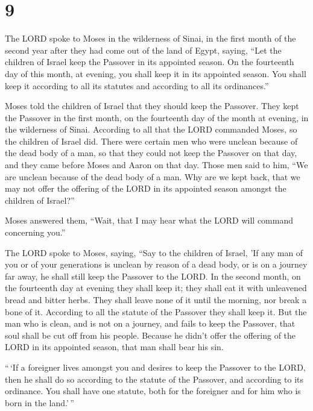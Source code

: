 \hypertarget{section-8}{%
\section{9}\label{section-8}}

 The LORD spoke to Moses in the wilderness of Sinai, in
the first month of the second year after they had come out of the land
of Egypt, saying,  ``Let the children of Israel keep the
Passover in its appointed season.  On the fourteenth day
of this month, at evening, you shall keep it in its appointed season.
You shall keep it according to all its statutes and according to all its
ordinances.''

 Moses told the children of Israel that they should keep
the Passover.  They kept the Passover in the first month,
on the fourteenth day of the month at evening, in the wilderness of
Sinai. According to all that the LORD commanded Moses, so the children
of Israel did.  There were certain men who were unclean
because of the dead body of a man, so that they could not keep the
Passover on that day, and they came before Moses and Aaron on that day.
 Those men said to him, ``We are unclean because of the
dead body of a man. Why are we kept back, that we may not offer the
offering of the LORD in its appointed season amongst the children of
Israel?''

 Moses answered them, ``Wait, that I may hear what the
LORD will command concerning you.''

 The LORD spoke to Moses, saying,  ``Say to
the children of Israel, 'If any man of you or of your generations is
unclean by reason of a dead body, or is on a journey far away, he shall
still keep the Passover to the LORD.  In the second
month, on the fourteenth day at evening they shall keep it; they shall
eat it with unleavened bread and bitter herbs.  They
shall leave none of it until the morning, nor break a bone of it.
According to all the statute of the Passover they shall keep it.
 But the man who is clean, and is not on a journey, and
fails to keep the Passover, that soul shall be cut off from his people.
Because he didn't offer the offering of the LORD in its appointed
season, that man shall bear his sin.

 ``\,`If a foreigner lives amongst you and desires to
keep the Passover to the LORD, then he shall do so according to the
statute of the Passover, and according to its ordinance. You shall have
one statute, both for the foreigner and for him who is born in the
land.'\,''


